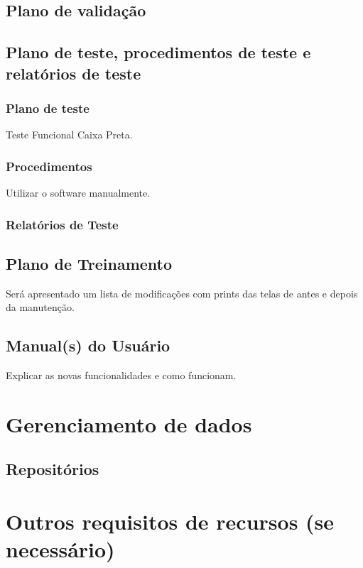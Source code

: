 \subsection{Plano de validação}

\subsection{Plano de teste, procedimentos de teste e relatórios de teste}

\subsubsection{Plano de teste}

Teste Funcional Caixa Preta.

\subsubsection{Procedimentos}

Utilizar o software manualmente.

\subsubsection{Relatórios de Teste}

\subsection{Plano de Treinamento}

Será apresentado um lista de modificações com prints das telas de antes e depois da manutenção.

\subsection{Manual(s) do Usuário}

Explicar as novas funcionalidades e como funcionam.

\section{Gerenciamento de dados}

\subsection{Repositórios}

\section{Outros requisitos de recursos (se necessário)}
